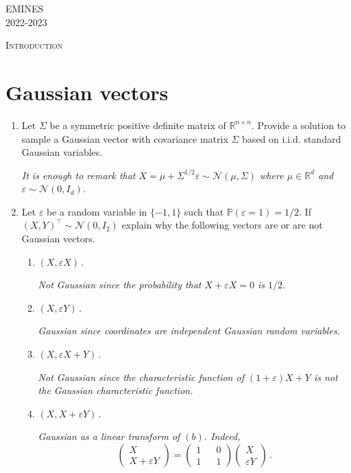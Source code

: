 \documentclass[a4paper,10pt,fleqn]{article}
\newcommand{\eqsp}{\,}
\newcommand{\rset}{\ensuremath{\mathbb{R}}}
\newcommand{\bP}{\mathbb{P}}
\newcommand{\X}{\ensuremath{\mathcal{X}}}
\newcommand{\1}{\ensuremath{\mathbbm{1}}}
\begin{document}
\noindent EMINES \hfill \\%
 2022-2023

\noindent\hrulefill

\begin{center}
\textsc{Introduction}
\end{center}
\hrulefill

\medskip


\section*{Gaussian vectors}
\begin{enumerate}
\item Let $\Sigma$ be a symmetric positive definite matrix of $\rset^{n\times n}$. Provide a solution to sample a Gaussian vector with covariance matrix $\Sigma$ based on i.i.d. standard Gaussian variables.

\vspace{.2cm}

{\em
It is enough to remark that $X = \mu +\Sigma^{1/2}\varepsilon \sim\mathcal{N}(\mu,\Sigma)$ where $\mu\in\rset^d$ and $\varepsilon \sim \mathcal{N}(0,I_d)$.
}

\item Let $\varepsilon$ be a random variable in $\{-1,1\}$ such that $\bP(\varepsilon = 1) = 1/2$. If $(X,Y)^\top\sim \mathcal{N}(0,I_2)$ explain why the following vectors are or are not Gaussian vectors.
\begin{enumerate}
\item $(X,\varepsilon X)$\eqsp.

{\em
Not Gaussian since the probability that  $X +\varepsilon X = 0$ is $1/2$.
}
\item $(X,\varepsilon Y)$\eqsp.

{\em
Gaussian since coordinates are independent Gaussian random variables.
}
\item $(X,\varepsilon X + Y)$\eqsp.

{\em
Not Gaussian since the characteristic function of $(1+\varepsilon) X + Y$ is not the Gaussian characteristic function.
}
\item $(X,X + \varepsilon Y)$\eqsp.

{\em
Gaussian as a linear transform of $(b)$. Indeed,
$$
\begin{pmatrix} X \\X + \varepsilon Y\end{pmatrix} = \begin{pmatrix} 1 && 0 \\1 && 1\end{pmatrix}\begin{pmatrix} X \\ \varepsilon Y\end{pmatrix}\eqsp.
$$
}
\end{enumerate}



\end{enumerate}
\end{document}
